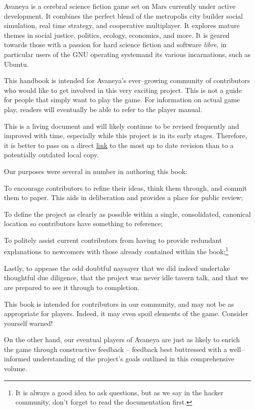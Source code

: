 

Avaneya is a cerebral science fiction game set on Mars currently under active development. It combines the perfect blend of the metropolis city builder social simulation, real time strategy, and cooperative multiplayer. It explores mature themes in social justice, politics, ecology, economics, and more. It is geared towards those with a passion for hard science fiction and software {\it libre}, in particular users of the GNU operating system and its various incarnations, such as Ubuntu.

This handbook is intended for Avaneya's ever--growing community of contributors who would like to get involved in this very exciting project. This is not a guide for people that simply want to play the game. For information on actual game play, readers will eventually be able to refer to the player manual.

This is a living document and will likely continue to be revised frequently and improved with time, especially while this project is in its early stages. Therefore, it is better to pass on a direct \href{\LatestHandbookURL}{link} to the most up to date revision than to a potentially outdated local copy.

Our purposes were several in number in authoring this book:

\startitemize[4]
\item
To encourage contributors to refine their ideas, think them through, and commit them to paper. This aids in deliberation and provides a place for public review;

\item
To define the project as clearly as possible within a single, consolidated, canonical location so contributors have something to reference;

\item
To politely assist current contributors from having to provide redundant explanations to newcomers with those already contained within the book;\footnote[rtfm]{It is always a good idea to ask questions, but as we say in the hacker community, don't forget to read the documentation first.}

\item
Lastly, to appease the odd doubtful naysayer that we did indeed undertake thoughtful due diligence, that the project was never idle tavern talk, and that we are prepared to see it through to completion.
\stopitemize

This book is intended for contributors in our community, and may not be as appropriate for players. Indeed, it may even spoil elements of the game. Consider yourself warned!

On the other hand, our eventual players of Avaneya are just as likely to enrich the game through constructive feedback -- feedback best buttressed with a well--informed understanding of the project's goals outlined in this comprehensive volume. 

\StopChapter
